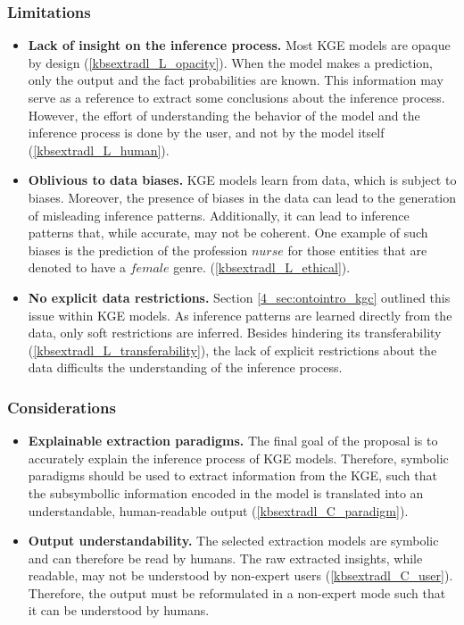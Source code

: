 \subsubsection*{Limitations}
\begin{itemize}
    \item \textbf{Lack of insight on the inference process.} Most KGE models are opaque by design (\ref{kbsextradl_L_opacity}). When the model makes a prediction, only the output and the fact probabilities are known. This information may serve as a reference to extract some conclusions about the inference process. However, the effort of understanding the behavior of the model and the inference process is done by the user, and not by the model itself (\ref{kbsextradl_L_human}).
    
    \item \textbf{Oblivious to data biases.} KGE models learn from data, which is subject to biases. Moreover, the presence of biases in the data can lead to the generation of misleading inference patterns. Additionally, it can lead to inference patterns that, while accurate, may not be coherent. One example of such biases is the prediction of the profession $nurse$ for those entities that are denoted to have a $female$ genre. (\ref{kbsextradl_L_ethical}). 
    
    \item \textbf{No explicit data restrictions.} Section \ref{4_sec:ontointro_kgc} outlined this issue within KGE models. As inference patterns are learned directly from the data, only soft restrictions are inferred. Besides hindering its transferability (\ref{kbsextradl_L_transferability}), the lack of explicit restrictions about the data difficults the understanding of the inference process.
\end{itemize}

\subsubsection*{Considerations}
\begin{itemize}
    \item \textbf{Explainable extraction paradigms.} The final goal of the proposal is to accurately explain the inference process of KGE models. Therefore, symbolic paradigms should be used to extract information from the KGE, such that the subsymbollic information encoded in the model is translated into an understandable, human-readable output (\ref{kbsextradl_C_paradigm}). 
    
    \item \textbf{Output understandability.} The selected extraction models are symbolic and can therefore be read by humans. The raw extracted insights, while readable, may not be understood by non-expert users (\ref{kbsextradl_C_user}). Therefore, the output must be reformulated in a non-expert mode such that it can be understood by humans.
\end{itemize}

